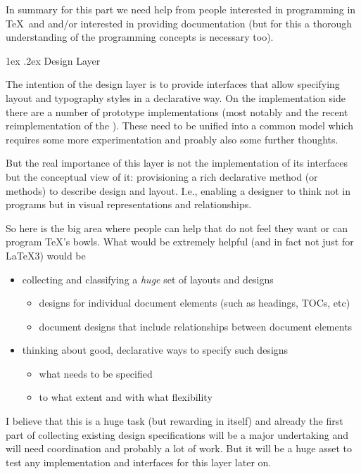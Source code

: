 \documentclass{ltnews}
\makeatletter
\newcommand{\@subheadingfont}{%
   \sffamily\slshape
   \let\LaTeX\cmssLaTeX\let\TeX\cmssTeX
}
\renewcommand{\subsection}{%
   \@startsection
      {section}{1}{\z@}{-1.5ex \@plus -1ex \@minus -.2ex}%
      {1ex \@plus.2ex}{\@subheadingfont}%
}
\makeatother
\begin{document}
In summary for this part we need help from people interested in programming in \TeX\ and  and/or interested in providing documentation (but for this a thorough understanding of the programming concepts is necessary too).

\subsection{Design Layer}

The intention of the design layer is to provide interfaces that allow specifying layout and typography styles in a declarative way. On the implementation side there are a number of prototype implementations (most notably  and the recent reimplementation of the ).
These need to be unified into a common model which requires some more experimentation and proably also some further thoughts.

But the real importance of this layer is not the implementation of its interfaces but the conceptual view of it: provisioning a rich declarative method (or methods) to describe design and layout. I.e., enabling a designer to think not in programs but in visual representations and relationships.

So here is the big area where people can help that do not feel they want or can program \TeX's bowls. What would be extremely helpful (and in fact not just for \LaTeX3) would be
\begin{itemize}
\item collecting and classifying a \emph{huge} set of layouts and designs
\begin{itemize}[nosep]
\item designs for individual document elements (such as headings, TOCs, etc)
\item document designs that include relationships between document elements
\end{itemize}
\item thinking about good, declarative ways to specify such designs
\begin{itemize}[nosep]
\item what needs to be specified
\item to what extent and with what flexibility
\end{itemize}
\end{itemize}
I believe that this is a huge task (but rewarding in itself) and already the first part of collecting existing design specifications will be a major undertaking and will need coordination and probably a lot of work. But it will be a huge asset to test any implementation and interfaces for this layer later on.
\end{document}
